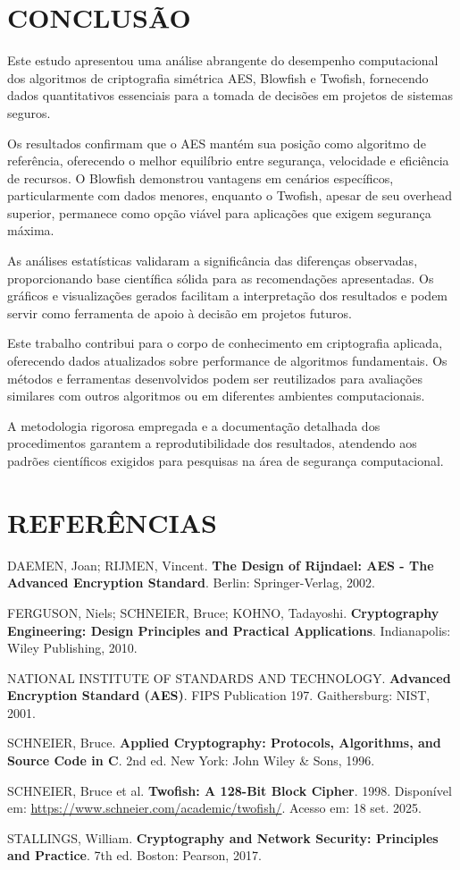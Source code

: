 \documentclass[12pt,a4paper,oneside]{article}
\begin{document}
\section{CONCLUSÃO}

Este estudo apresentou uma análise abrangente do desempenho computacional dos algoritmos de criptografia simétrica AES, Blowfish e Twofish, fornecendo dados quantitativos essenciais para a tomada de decisões em projetos de sistemas seguros.

Os resultados confirmam que o AES mantém sua posição como algoritmo de referência, oferecendo o melhor equilíbrio entre segurança, velocidade e eficiência de recursos. O Blowfish demonstrou vantagens em cenários específicos, particularmente com dados menores, enquanto o Twofish, apesar de seu overhead superior, permanece como opção viável para aplicações que exigem segurança máxima.

As análises estatísticas validaram a significância das diferenças observadas, proporcionando base científica sólida para as recomendações apresentadas. Os gráficos e visualizações gerados facilitam a interpretação dos resultados e podem servir como ferramenta de apoio à decisão em projetos futuros.

Este trabalho contribui para o corpo de conhecimento em criptografia aplicada, oferecendo dados atualizados sobre performance de algoritmos fundamentais. Os métodos e ferramentas desenvolvidos podem ser reutilizados para avaliações similares com outros algoritmos ou em diferentes ambientes computacionais.

A metodologia rigorosa empregada e a documentação detalhada dos procedimentos garantem a reprodutibilidade dos resultados, atendendo aos padrões científicos exigidos para pesquisas na área de segurança computacional.

\section{REFERÊNCIAS}

DAEMEN, Joan; RIJMEN, Vincent. \textbf{The Design of Rijndael: AES - The Advanced Encryption Standard}. Berlin: Springer-Verlag, 2002.

FERGUSON, Niels; SCHNEIER, Bruce; KOHNO, Tadayoshi. \textbf{Cryptography Engineering: Design Principles and Practical Applications}. Indianapolis: Wiley Publishing, 2010.

NATIONAL INSTITUTE OF STANDARDS AND TECHNOLOGY. \textbf{Advanced Encryption Standard (AES)}. FIPS Publication 197. Gaithersburg: NIST, 2001.

SCHNEIER, Bruce. \textbf{Applied Cryptography: Protocols, Algorithms, and Source Code in C}. 2nd ed. New York: John Wiley \& Sons, 1996.

SCHNEIER, Bruce et al. \textbf{Twofish: A 128-Bit Block Cipher}. 1998. Disponível em: \url{https://www.schneier.com/academic/twofish/}. Acesso em: 18 set. 2025.

STALLINGS, William. \textbf{Cryptography and Network Security: Principles and Practice}. 7th ed. Boston: Pearson, 2017.
\end{document}
